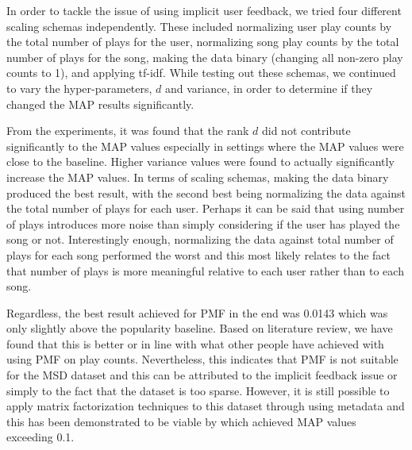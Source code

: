 \documentclass[12pt,preprint]{aastex}
\begin{document}
In order to tackle the issue of using implicit user feedback, we tried four different scaling schemas independently. These included normalizing user play counts by the total number of plays for the user, normalizing song play counts by the total number of plays for the song, making the data binary (changing all non-zero play counts to 1), and  applying tf-idf. While testing out these schemas, we continued to vary the hyper-parameters, $d$ and variance, in order to determine if they changed the MAP results significantly. 
 
From the experiments, it was found that the rank $d$ did not contribute significantly to the MAP values especially in settings where the MAP values were close to the baseline. Higher variance values were found to actually significantly increase the MAP values. In terms of scaling schemas, making the data binary produced the best result, with the second best being normalizing the data against the total number of plays for each user. Perhaps it can be said that using number of plays introduces more noise than simply considering if the user has played the song or not. Interestingly enough, normalizing the data against total number of plays for each song performed the worst and this most likely relates to the fact that number of plays is more meaningful relative to each user rather than to each song.
 
Regardless, the best result achieved for PMF in the end was 0.0143 which was only slightly above the popularity baseline. Based on literature review, we have found that this is better or in line with what other people have achieved with using PMF on play counts. Nevertheless, this indicates that PMF is not suitable for the MSD dataset and this can be attributed to the implicit feedback issue or simply to the fact that the dataset is too sparse. However, it is still possible to apply matrix factorization techniques to this dataset through using metadata and this has been demonstrated to be viable by \citep{liangcodebook} which achieved MAP values exceeding 0.1.  

\citep{hu2008collaborative}



%
\end{document}
